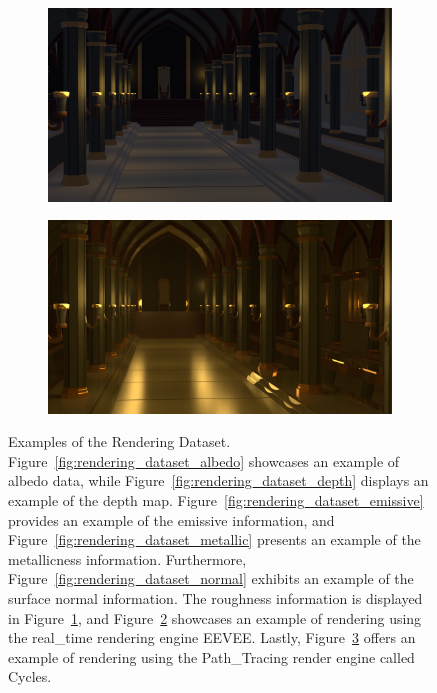 \begin{figure}
\begin{subfigure}{0.24\linewidth}
         \caption{}
         \label{fig:rendering_dataset_roughness}
    \end{subfigure}
    \hfill
    \begin{subfigure}{0.24\linewidth}
        \centering
         \includegraphics[width=\textwidth]{figures/methods/dataset_example/eevee.png}
         \caption{}
         \label{fig:rendering_dataset_eevee}
    \end{subfigure}
    \hfill
    \begin{subfigure}{0.24\linewidth}
        \centering
         \includegraphics[width=\textwidth]{figures/methods/dataset_example/cycles.png}
         \caption{}
         \label{fig:rendering_dataset_cycles}
    \end{subfigure}
    \caption[Extraction from the RenderDataset]{Examples of the Rendering Dataset. Figure~\ref{fig:rendering_dataset_albedo} showcases an example of albedo data, while Figure~\ref{fig:rendering_dataset_depth} displays an example of the depth map. Figure~\ref{fig:rendering_dataset_emissive} provides an example of the emissive information, and Figure~\ref{fig:rendering_dataset_metallic} presents an example of the metallicness information. Furthermore, Figure~\ref{fig:rendering_dataset_normal} exhibits an example of the surface normal information. The roughness information is displayed in Figure~\ref{fig:rendering_dataset_roughness}, and Figure~\ref{fig:rendering_dataset_eevee} showcases an example of rendering using the real_time rendering engine EEVEE. Lastly, Figure~\ref{fig:rendering_dataset_cycles} offers an example of rendering using the Path_Tracing render engine called Cycles.}
    \label{fig:render_dataset_examples}
    
\end{figure}

